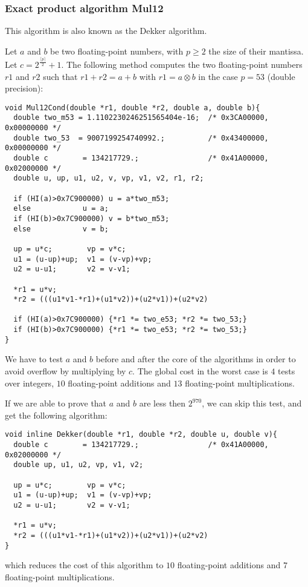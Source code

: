 \subsubsection{Exact product algorithm {Mul12}}

This algorithm is also known as the Dekker algorithm.

\begin{theorem}
  Let $a$ and $b$ be two floating-point numbers, with $p \geq 2$ the
  size of their mantissa. Let $c=2^{\frac{\lceil p \rceil}{2}}+1$. The
  following method computes the two floating-point numbers $r1$ and
  $r2$ such that $r1 + r2 = a + b$ with $r1 = a \otimes b$ in the case
  $p=53$ (double precision):


\begin{lstlisting}[label={lst:Mul12Cond},caption={Mul12Cond},firstnumber=1]
void Mul12Cond(double *r1, double *r2, double a, double b){
  double two_m53 = 1.1102230246251565404e-16;  /* 0x3CA00000, 0x00000000 */
  double two_53  = 9007199254740992.;          /* 0x43400000, 0x00000000 */
  double c        = 134217729.;                /* 0x41A00000, 0x02000000 */ 
  double u, up, u1, u2, v, vp, v1, v2, r1, r2;

  if (HI(a)>0x7C900000) u = a*two_m53; 
  else            u = a;
  if (HI(b)>0x7C900000) v = b*two_m53; 
  else            v = b;

  up = u*c;        vp = v*c;
  u1 = (u-up)+up;  v1 = (v-vp)+vp;
  u2 = u-u1;       v2 = v-v1;
  
  *r1 = u*v;
  *r2 = (((u1*v1-*r1)+(u1*v2))+(u2*v1))+(u2*v2)

  if (HI(a)>0x7C900000) {*r1 *= two_e53; *r2 *= two_53;} 
  if (HI(b)>0x7C900000) {*r1 *= two_e53; *r2 *= two_53;} 
} 
\end{lstlisting}

We have to test $a$ and $b$ before and after the core of the
algorithms in order to avoid overflow by multiplying by $c$. The
global cost in the worst case is $4$ tests over integers, $10$
floating-point additions and $13$ floating-point multiplications.
\end{theorem}

If we are able to prove that $a$ and $b$ are less then $2^{970}$, we can skip
this test, and get the following algorithm:
\begin{lstlisting}[label={lst:Mul12},caption={Mul12},firstnumber=1]
void inline Dekker(double *r1, double *r2, double u, double v){
  double c        = 134217729.;                /* 0x41A00000, 0x02000000 */ 
  double up, u1, u2, vp, v1, v2;

  up = u*c;        vp = v*c;
  u1 = (u-up)+up;  v1 = (v-vp)+vp;
  u2 = u-u1;       v2 = v-v1;
  
  *r1 = u*v;
  *r2 = (((u1*v1-*r1)+(u1*v2))+(u2*v1))+(u2*v2)
}
\end{lstlisting}
which reduces the cost of this algorithm to $10$ floating-point
additions and $7$ floating-point multiplications.







